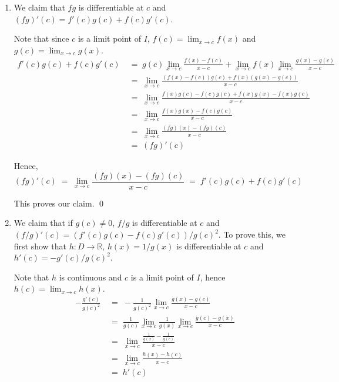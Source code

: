 \documentclass[10pt]{article}
\begin{document}
\begin{enumerate}
                This proves our claim. \qed

                \item We claim that $fg$ is differentiable at $c$ and $(fg)'(c) = f'(c)g(c) + f(c)g'(c)$.
                
                Note that since $c$ is a limit point of $I$, $f(c) = \lim_{x \to c} f(x)$ and $g(c) = \lim_{x \to c} g(x)$.
                \begin{align*}
                        f'(c)g(c) + f(c)g'(c)
                        \;&=\; g(c) \lim_{x \to c} \frac{f(x) - f(c)}{x - c} + \lim_{x \to c} f(x) \lim_{x \to c} \frac{g(x) - g(c)}{x - c} \\
                        \;&=\; \lim_{x \to c} \frac{(f(x) - f(c))g(c) + f(x)(g(x) - g(c))}{x - c} \\
                        \;&=\; \lim_{x \to c} \frac{f(x)g(c) - f(c)g(c) + f(x)g(x) - f(x)g(c)}{x - c} \\
                        \;&=\; \lim_{x \to c} \frac{f(x)g(x) - f(c)g(c)}{x - c} \\
                        \;&=\; \lim_{x \to c} \frac{(fg)(x) - (fg)(c)}{x - c} \\
                        \;&=\; (fg)'(c)
                \end{align*}

                Hence,
                \[
                (fg)'(c) \;=\; \lim_{x \to c} \frac{(fg)(x) - (fg)(c)}{x - c} \;=\; f'(c)g(c) + f(c)g'(c)
                \]

                This proves our claim. \qed


                \item We claim that if $g(c) \neq 0$, $f /g$ is differentiable at $c$ and $(f /g)'(c) = (f'(c)g(c) - f(c)g'(c))/g(c)^2$.
                To prove this, we first show that $h\colon D \to \mathbb{R}$, $h(x) = 1/g(x)$ is
                differentiable at $c$ and $h'(c) = -g'(c) /g(c)^2$.

                Note that $h$ is continuous and $c$ is a limit point of $I$, hence $h(c) = \lim_{x \to c} h(x)$.
                \begin{align*}
                -\frac{g'(c)}{g(c)^2} \;&=\; -\frac{1}{g(c)^2} \lim_{x \to c} \frac{g(x) - g(c)}{x - c} \\
                        \;&=\; \frac{1}{g(c)} \lim_{x \to c}\frac{1}{g(x)} \lim_{x \to c} \frac{g(c) - g(x)}{x - c} \\
                        \;&=\; \lim_{x \to c} \frac{\frac{1}{g(x)} - \frac{1}{g(c)}}{x - c} \\
                        \;&=\; \lim_{x \to c} \frac{h(x) - h(c)}{x - c} \\
                        \;&=\; h'(c)
                \end{align*}


\end{enumerate}
\end{document}
